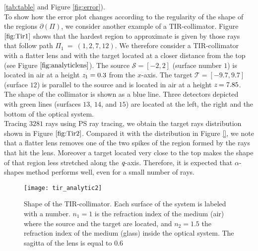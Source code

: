  \ref{tab:table} and Figure \ref{fig:error}).
 \\\indent To show how the error plot changes according to the regularity of the shape of the regions $\partial$$(\Pi)$, we consider another example of a TIR-collimator.
 Figure $\ref{fig:Tir1}$ shows that the hardest region to approximate is given by those rays that follow path $\Pi_1 ~=~ (1,2,7,12)$.
 We therefore consider a TIR-collimator with a flatter lens and with the target located at a closer distance from the top (see Figure $\ref{fig:analyticlens}$). 
The source $\mathcal{S}= [-2,2]$ (surface number $1$) is located in air at a height $\textit{z}_1 = 0.3$ from the $x$-axis.
       The target $\mathcal{T}= [-9.7, 9.7]$ (surface $12$) is parallel to the source and is located in air at a height $ \textit{z}= 7.85$.
       The shape of the collimator is shown as a blue line.
       Three detectors depicted with green lines (surfaces $13$, $14$, and $15$) are located at the left, the right and the bottom of the optical system.
 \\ \indent Tracing $3281$ rays using PS ray tracing, we obtain the target rays distribution shown in Figure $\ref{fig:Tir2}$. 
Compared it with the distribution in Figure \ref{}, we note that a flatter lens removes one of the two spikes of the region formed by the rays that hit the lens.
Moreover a target located very close to the top makes the shape of that region less stretched along the $\textit{q}$-axis.
Therefore, it is expected that $\alpha$-shapes method performs well, even for a small number of rays.
\begin{figure}[h]
  \begin{center}
  \texttt{[image: tir\_analytic2]}
   \end{center}
    \caption{Shape of the TIR-collimator. Each surface of the system is labeled with a number.
       $n_1 = 1$ is the refraction index of the medium (air) where the source and the target are located, and
       $n_2 = 1.5 $ the refraction index of the medium (glass) inside the optical system. The sagitta of the lens is equal to $0.6$}
 \label{fig:analyticlens}
\end{figure}
